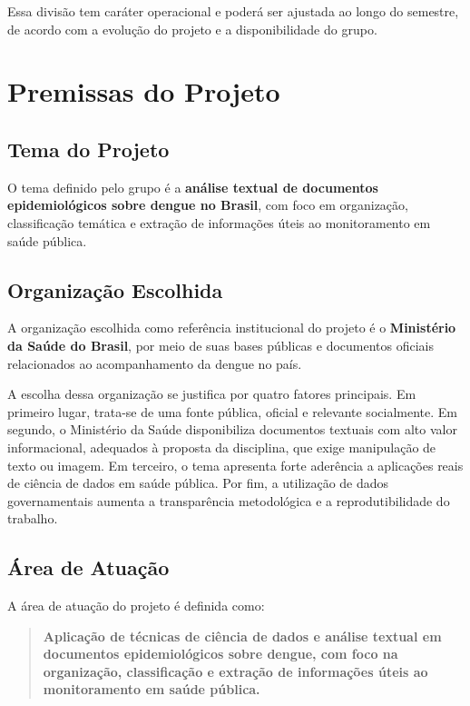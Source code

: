 \documentclass[12pt,a4paper]{article}
\begin{document}
Essa divisão tem caráter operacional e poderá ser ajustada ao longo do semestre, de acordo com a evolução do projeto e a disponibilidade do grupo.

\clearpage
\section{Premissas do Projeto}

\subsection{Tema do Projeto}

O tema definido pelo grupo é a \textbf{análise textual de documentos epidemiológicos sobre dengue no Brasil}, com foco em organização, classificação temática e extração de informações úteis ao monitoramento em saúde pública.

\subsection{Organização Escolhida}

A organização escolhida como referência institucional do projeto é o \textbf{Ministério da Saúde do Brasil}, por meio de suas bases públicas e documentos oficiais relacionados ao acompanhamento da dengue no país.

A escolha dessa organização se justifica por quatro fatores principais. Em primeiro lugar, trata-se de uma fonte pública, oficial e relevante socialmente. Em segundo, o Ministério da Saúde disponibiliza documentos textuais com alto valor informacional, adequados à proposta da disciplina, que exige manipulação de texto ou imagem. Em terceiro, o tema apresenta forte aderência a aplicações reais de ciência de dados em saúde pública. Por fim, a utilização de dados governamentais aumenta a transparência metodológica e a reprodutibilidade do trabalho.

\subsection{Área de Atuação}

A área de atuação do projeto é definida como:

\begin{quote}
\textbf{Aplicação de técnicas de ciência de dados e análise textual em documentos epidemiológicos sobre dengue, com foco na organização, classificação e extração de informações úteis ao monitoramento em saúde pública.}
\end{quote}
\end{document}

